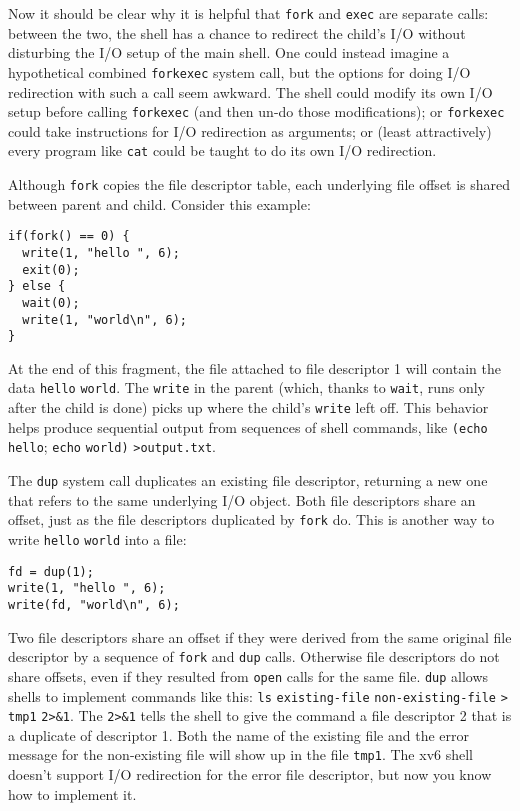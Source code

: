 Now it should be clear why it is helpful that
\lstinline{fork}
and 
\lstinline{exec} 
are separate calls: between the two, the shell has a chance
to redirect the child's I/O without disturbing the I/O setup of the main shell.
One could instead imagine a hypothetical combined
\lstinline{forkexec} system call,
but the options for doing I/O redirection with such a call
seem awkward.
The shell could modify its own I/O
setup before calling \lstinline{forkexec} (and then
un-do those modifications); or
\lstinline{forkexec} could take instructions for I/O
redirection as arguments;
or (least attractively) every program like \lstinline{cat} could
be taught to do its own I/O redirection.

Although
\lstinline{fork}
copies the file descriptor table, each underlying file offset is shared
between parent and child.
Consider this example:
\begin{lstlisting}[]
if(fork() == 0) {
  write(1, "hello ", 6);
  exit(0);
} else {
  wait(0);
  write(1, "world\n", 6);
}
\end{lstlisting}
At the end of this fragment, the file attached to file descriptor 1
will contain the data
\lstinline{hello}
\lstinline{world}.
The
\lstinline{write}
in the parent
(which, thanks to
\lstinline{wait},
runs only after the child is done)
picks up where the child's
\lstinline{write}
left off.
This behavior helps produce sequential output from sequences
of shell commands, like
\lstinline{(echo}
\lstinline{hello};
\lstinline{echo}
\lstinline{world)}
\lstinline{>output.txt}.

The
\lstinline{dup}
system call duplicates an existing file descriptor,
returning a new one that refers to the same underlying I/O object.
Both file descriptors share an offset, just as the file descriptors
duplicated by
\lstinline{fork}
do.
This is another way to write
\lstinline{hello}
\lstinline{world}
into a file:
\begin{lstlisting}[]
fd = dup(1);
write(1, "hello ", 6);
write(fd, "world\n", 6);
\end{lstlisting}

Two file descriptors share an offset if they were derived from
the same original file descriptor by a sequence of
\lstinline{fork}
and
\lstinline{dup}
calls.
Otherwise file descriptors do not share offsets, even if they
resulted from 
\lstinline{open}
calls for the same file.  
\lstinline{dup} 
allows shells to implement commands like this:
\lstinline{ls}
\lstinline{existing-file}
\lstinline{non-existing-file}
\lstinline{>}
\lstinline{tmp1}
\lstinline{2>&1}.
The
\lstinline{2>&1}
tells the shell to give the command a file descriptor 2 that
is a duplicate of descriptor 1.
Both the name of the existing file and the error message for the
non-existing file will show up in the file
\lstinline{tmp1}.
The xv6 shell doesn't support I/O redirection for the error file
descriptor, but now you know how to implement it.


